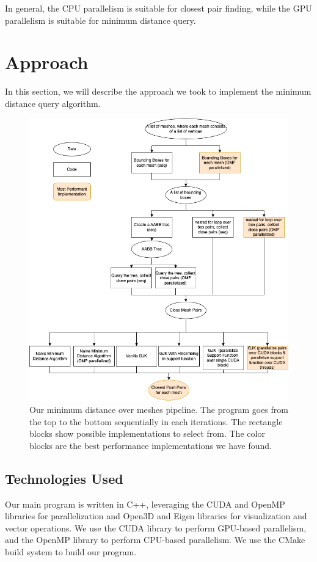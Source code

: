 \documentclass[12pt,fleqn]{article}
\begin{document}
In general, the CPU parallelism is suitable for closest pair finding, while the GPU parallelism is suitable for minimum distance query.






\section{Approach}
In this section, we will describe the approach we took to implement the minimum distance query algorithm.

\begin{figure}[ht!]
    \centering
    \includegraphics[width=1.0\textwidth]{figs/pipeline.drawio.png}
    \caption{%
            Our minimum distance over meshes pipeline. The program goes from the top to the bottom sequentially in each iterations. The rectangle blocks show possible implementations to select from. The color blocks are the best performance implementations we have found.}
\end{figure}

\subsection{Technologies Used}
Our main program is written in C++, leveraging the CUDA and OpenMP libraries for parallelization and Open3D and Eigen libraries for visualization and vector operations.
We use the CUDA library to perform GPU-based parallelism, and the OpenMP library to perform CPU-based parallelism.
We use the CMake build system to build our program.
\end{document}
